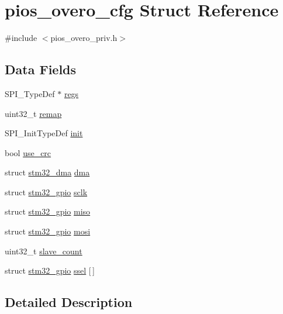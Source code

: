 \hypertarget{structpios__overo__cfg}{\section{pios\-\_\-overo\-\_\-cfg \-Struct \-Reference}
\label{structpios__overo__cfg}
}


{\ttfamily \#include $<$pios\-\_\-overo\-\_\-priv.\-h$>$}

\subsection*{\-Data \-Fields}
\begin{DoxyCompactItemize}
\item 
\-S\-P\-I\-\_\-\-Type\-Def $\ast$ \hyperlink{structpios__overo__cfg_ad650bcb134b4b4c297048d8747734b54}{regs}
\item 
uint32\-\_\-t \hyperlink{structpios__overo__cfg_a4e5e4acb1ac26af5b7938d2e41387f2d}{remap}
\item 
\-S\-P\-I\-\_\-\-Init\-Type\-Def \hyperlink{structpios__overo__cfg_a7eab710432a7a408f6bc9312e5d12e24}{init}
\item 
bool \hyperlink{structpios__overo__cfg_afee45313c7db22563bb644ca87b79bac}{use\-\_\-crc}
\item 
struct \hyperlink{structstm32__dma}{stm32\-\_\-dma} \hyperlink{structpios__overo__cfg_a16a7dbb7388c47c8b5479da68176de6c}{dma}
\item 
struct \hyperlink{structstm32__gpio}{stm32\-\_\-gpio} \hyperlink{structpios__overo__cfg_a5d9ae103e82aa3ea8845e181dd76f19f}{sclk}
\item 
struct \hyperlink{structstm32__gpio}{stm32\-\_\-gpio} \hyperlink{structpios__overo__cfg_a4f182bb3911f41c5e505ed81e688c343}{miso}
\item 
struct \hyperlink{structstm32__gpio}{stm32\-\_\-gpio} \hyperlink{structpios__overo__cfg_a5aea93e3a5fcc6249bad26a9ffcccc8a}{mosi}
\item 
uint32\-\_\-t \hyperlink{structpios__overo__cfg_a77972607cc3846ca93052fa2e4efdce3}{slave\-\_\-count}
\item 
struct \hyperlink{structstm32__gpio}{stm32\-\_\-gpio} \hyperlink{structpios__overo__cfg_a900adf7a473ee816fb7044425cabd0de}{ssel} \mbox{[}$\,$\mbox{]}
\end{DoxyCompactItemize}


\subsection{\-Detailed \-Description}


